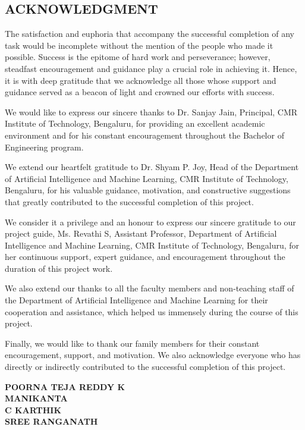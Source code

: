 \documentclass[12pt,a4paper]{report}
\begin{document}
\newpage
\thispagestyle{plain}
\begin{center}
\section*{ACKNOWLEDGMENT}
\end{center}

The satisfaction and euphoria that accompany the successful completion of any task would be incomplete without the mention of the people who made it possible. Success is the epitome of hard work and perseverance; however, steadfast encouragement and guidance play a crucial role in achieving it. Hence, it is with deep gratitude that we acknowledge all those whose support and guidance served as a beacon of light and crowned our efforts with success.

We would like to express our sincere thanks to Dr. Sanjay Jain, Principal, CMR Institute of Technology, Bengaluru, for providing an excellent academic environment and for his constant encouragement throughout the Bachelor of Engineering program.

We extend our heartfelt gratitude to Dr. Shyam P. Joy, Head of the Department of Artificial Intelligence and Machine Learning, CMR Institute of Technology, Bengaluru, for his valuable guidance, motivation, and constructive suggestions that greatly contributed to the successful completion of this project.

We consider it a privilege and an honour to express our sincere gratitude to our project guide, Ms. Revathi S, Assistant Professor, Department of Artificial Intelligence and Machine Learning, CMR Institute of Technology, Bengaluru, for her continuous support, expert guidance, and encouragement throughout the duration of this project work.

We also extend our thanks to all the faculty members and non-teaching staff of the Department of Artificial Intelligence and Machine Learning for their cooperation and assistance, which helped us immensely during the course of this project.

Finally, we would like to thank our family members for their constant encouragement, support, and motivation. We also acknowledge everyone who has directly or indirectly contributed to the successful completion of this project.

\vspace{2cm}
\begin{flushright}
\textbf{POORNA TEJA REDDY K}\\
\textbf{MANIKANTA}\\
\textbf{C KARTHIK}\\
\textbf{SREE RANGANATH}
\end{flushright}
\newpage
\end{document}

